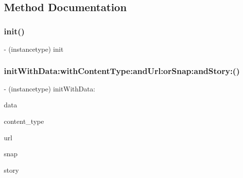 \subsection{Method Documentation}
\hypertarget{interface_snap_viewer_view_controller_ae35bd2e3d57eff9a6ed5be1031eb4b0e}{}\label{interface_snap_viewer_view_controller_ae35bd2e3d57eff9a6ed5be1031eb4b0e} 
\subsubsection{\texorpdfstring{init()}{init()}}
{\footnotesize\ttfamily -\/ (instancetype) init \begin{DoxyParamCaption}{ }\end{DoxyParamCaption}}

\hypertarget{interface_snap_viewer_view_controller_a1888c9ca900f5160de0e5ca706f0ecd8}{}\label{interface_snap_viewer_view_controller_a1888c9ca900f5160de0e5ca706f0ecd8} 
\subsubsection{\texorpdfstring{init\+With\+Data\+:with\+Content\+Type\+:and\+Url\+:or\+Snap\+:and\+Story\+:()}{initWithData:withContentType:andUrl:orSnap:andStory:()}}
{\footnotesize\ttfamily -\/ (instancetype) init\+With\+Data\+: \begin{DoxyParamCaption}\item[{(N\+S\+Data $\ast$)}]{data }\item[{withContentType:(int)}]{content\+\_\+type }\item[{andUrl:(N\+S\+U\+RL $\ast$)}]{url }\item[{orSnap:(\hyperlink{interface_snap}{Snap} $\ast$)}]{snap }\item[{andStory:(\hyperlink{interface_story}{Story} $\ast$)}]{story }\end{DoxyParamCaption}}



